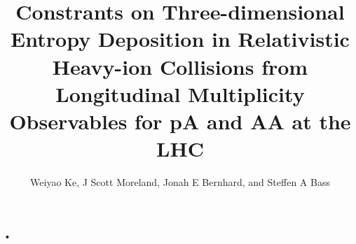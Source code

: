 \documentclass[11pt]{beamer}
\author[WK, JSM, JEB, and SAB]{Weiyao Ke, J Scott Moreland, Jonah E Bernhard,
		and Steffen A Bass}
\title{Constrants on Three-dimensional Entropy Deposition in Relativistic
		Heavy-ion Collisions from Longitudinal Multiplicity Observables
		for pA and AA at the LHC }
\begin{document}
\begin{frame}
\titlepage
\end{frame}

\section{}
\begin{frame}{•}

\end{frame}
\end{document}

